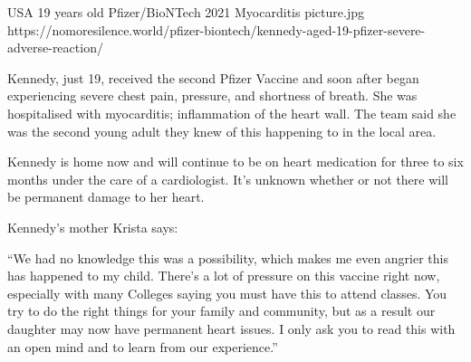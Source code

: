 {USA}
{19 years old}
{Pfizer/BioNTech}
{2021}
{Myocarditis}
{picture.jpg}
{https://nomoresilence.world/pfizer-biontech/kennedy-aged-19-pfizer-severe-adverse-reaction/}
{

Kennedy, just 19, received the second Pfizer Vaccine and soon after began
experiencing severe chest pain, pressure, and shortness of breath. She was
hospitalised with myocarditis; inflammation of the heart wall. The team said she
was the second young adult they knew of this happening to in the local area.

Kennedy is home now and will continue to be on heart medication for three to six
months under the care of a cardiologist. It’s unknown whether or not there will
be permanent damage to her heart.

Kennedy’s mother Krista says:

“We had no knowledge this was a possibility, which makes me even angrier this
has happened to my child. There’s a lot of pressure on this vaccine right now,
especially with many Colleges saying you must have this to attend classes. You
try to do the right things for your family and community, but as a result our
daughter may now have permanent heart issues. I only ask you to read this with
an open mind and to learn from our experience.”

}
